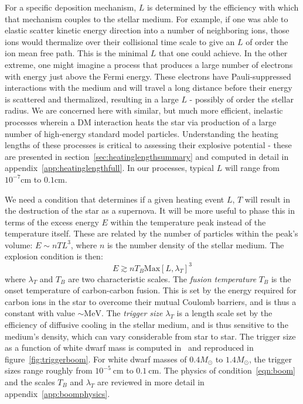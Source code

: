 \documentclass[11 pt,preprint,preprintnumbers,amsmath,amssymb, prd]{revtex4}
\newcommand{\MeV}{\text{MeV}}
\newcommand{\cm}{\text{cm}}
\begin{document}
For a specific deposition mechanism, $L$ is determined by the efficiency with which that mechanism couples to the stellar medium.  For example, if one was able to elastic scatter kinetic energy direction into a number of neighboring ions, those ions would thermalize over their collisional time scale to give an $L$ of order the ion mean free path.  This is the minimal $L$ that one could achieve.  In the other extreme, one might imagine a process that produces a large number of electrons with energy just above the Fermi energy.  These electrons have Pauli-suppressed interactions with the medium and will travel a long distance before their energy is scattered and thermalized, resulting in a large $L$ - possibly of order the stellar radius.  We are concerned here with similar, but much more efficient, inelastic processes wherein a DM interaction heats the star via production of a large number of high-energy standard model particles.  Understanding the heating lengths of these processes is critical to assessing their explosive potential - these are presented in section~\ref{sec:heatinglengthsummary} and computed in detail in appendix~\ref{app:heatinglengthfull}.  In our processes, typical $L$ will range from $10^{-7} \cm$ to $0.1 \cm$.

We need a condition that determines if a given heating event $L$, $T$ will result in the destruction of the star as a supernova.  It will be more useful to phase this in terms of the excess energy $E$ within the temperature peak instead of the temperature itself.  These are related by the number of particles within the peak's volume: $E \sim n T L^3$, where $n$ is the number density of the stellar medium.  The explosion condition is then:
\begin{equation}
\label{eqn:boom}
    E \gtrsim n T_B \text{Max}\left[L, \lambda_T\right]^3    
\end{equation}
where $\lambda_T$ and $T_B$ are two characteristic scales.  The \emph{fusion temperature} $T_B$ is the onset temperature of carbon-carbon fusion.  This is set by the energy required for carbon ions in the star to overcome their mutual Coulomb barriers, and is thus a constant with value $\sim \MeV$.  The \emph{trigger size} $\lambda_T$ is a length scale set by the efficiency of diffusive cooling in the stellar medium, and is thus sensitive to the medium's density, which can vary considerable from star to star.  The trigger size as a function of white dwarf mass is computed in~\cite{Graham:2015apa} and reproduced in figure~\ref{fig:triggerboom}.  For white dwarf masses of $0.4 M_{\odot}$ to $1.4 M_{\odot}$, the trigger sizes range roughly from $10^{-5} ~\text{cm}$ to $0.1 ~\text{cm}$. The physics of condition~\ref{eqn:boom} and the scales $T_B$ and $\lambda_T$ are reviewed in more detail in appendix~\ref{app:boomphysics}. 
\end{document}

